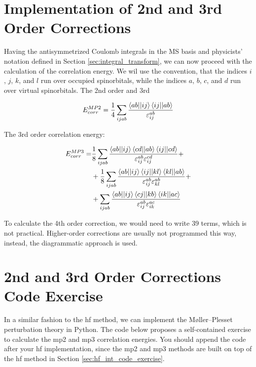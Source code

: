 \section{Implementation of 2nd and 3rd Order Corrections}

Having the antisymmetrized Coulomb integrals in the MS basis and physicists' notation defined in Section \ref{sec:integral_transform}, we can now proceed with the calculation of the correlation energy. We wil use the convention, that the indices \(i\), \(j\), \(k\), and \(l\) run over occupied spinorbitals, while the indices \(a\), \(b\), \(c\), and \(d\) run over virtual spinorbitals. The 2nd order and 3rd

\begin{equation}
E_{corr}^{MP2}=\frac{1}{4}\sum_{ijab}\frac{\braket{ab||ij}\braket{ij||ab}}{\varepsilon_{ij}^{ab}}
\end{equation}

The 3rd order correlation energy:

\begin{align}
E_{corr}^{MP3}=&\frac{1}{8}\sum_{ijab}\frac{\braket{ab||ij}\braket{cd||ab}\braket{ij||cd}}{\varepsilon_{ij}^{ab}\varepsilon_{ij}^{cd}}+\nonumber \\
&+\frac{1}{8}\sum_{ijab}\frac{\braket{ab||ij}\braket{ij||kl}\braket{kl||ab}}{\varepsilon_{ij}^{ab}\varepsilon_{kl}^{ab}}+\nonumber \\
&+\sum_{ijab}\frac{\braket{ab||ij}\braket{cj||kb}\braket{ik||ac}}{\varepsilon_{ij}^{ab}\varepsilon_{ik}^{ac}}
\end{align}

To calculate the 4th order correction, we would need to write 39 terms, which is not practical. Higher-order corrections are usually not programmed this way, instead, the diagrammatic approach is used.\cite{1014569052,10.1016/0010-4655!73!90016-7,10.1016/0010-4655!73!90017-9}

\section{2nd and 3rd Order Corrections Code Exercise}

In a similar fashion to the \acrshort{hf} method, we can implement the Møller--Plesset perturbation theory in Python. The code below proposes a self-contained exercise to calculate the \acrfull{mp2} and \acrfull{mp3} correlation energies. You should append the code after your \acrshort{hf} implementation, since the \acrshort{mp2} and \acrshort{mp3} methods are built on top of the \acrshort{hf} method in Section \ref{sec:hf_int_code_exercise}.


